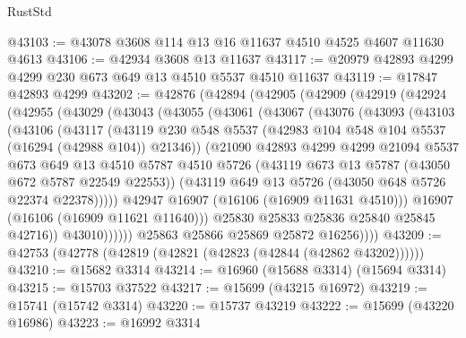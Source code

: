\begin{lexlean}{RustStd}
\begin{coremodule}
@43103 := @43078 @3608 @114 @13 @16 @11637 @4510 @4525 @4607 @11630 @4613
@43106 := @42934 @3608 @13 @11637
@43117 := @20979 @42893 @4299 @4299 @230 @673 @649 @13 @4510 @5537 @4510 @11637
@43119 := @17847 @42893 @4299
@43202 := @42876
    (@42894
      (@42905
        (@42909
          (@42919
            (@42924
              (@42955
                (@43029
                  (@43043
                    (@43055
                      (@43061
                        (@43067
                          (@43076
                            (@43093
                              (@43103
                                (@43106
                                  (@43117
                                    (@43119
                                      @230
                                      @548
                                      @5537
                                      (@42983 @104 @548 @104 @5537 (@16294 (@42988 @104)) @21346))
                                    (@21090
                                      @42893
                                      @4299
                                      @4299
                                      @21094
                                      @5537
                                      @673
                                      @649
                                      @13
                                      @4510
                                      @5787
                                      @4510
                                      @5726
                                      (@43119 @673 @13 @5787 (@43050 @672 @5787 @22549 @22553))
                                      (@43119 @649 @13 @5726 (@43050 @648 @5726 @22374 @22378)))))
                                @42947
                                @16907
                                (@16106 (@16909 @11631 @4510)))
                              @16907
                              (@16106 (@16909 @11621 @11640)))
                            @25830
                            @25833
                            @25836
                            @25840
                            @25845
                            @42716))
                        @43010))))))
            @25863
            @25866
            @25869
            @25872
            @16256))))
@43209 := @42753 (@42778 (@42819 (@42821 (@42823 (@42844 (@42862 @43202))))))
@43210 := @15682 @3314
@43214 := @16960 (@15688 @3314) (@15694 @3314)
@43215 := @15703 @37522
@43217 := @15699 (@43215 @16972)
@43219 := @15741 (@15742 @3314)
@43220 := @15737 @43219
@43222 := @15699 (@43220 @16986)
@43223 := @16992 @3314

\end{coremodule}
\end{lexlean}
